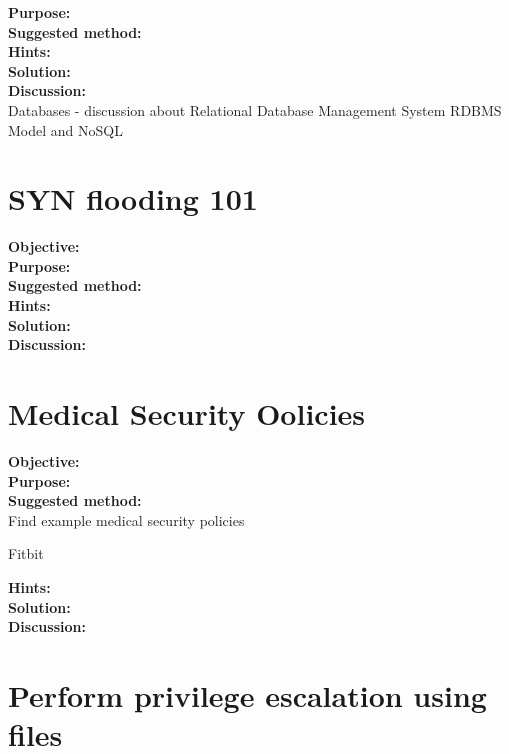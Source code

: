 \documentclass[a4paper,11pt,notitlepage]{report}
\begin{document}
{\bf Purpose:}\\


{\bf Suggested method:}\\


{\bf Hints:}\\


{\bf Solution:}\\


{\bf Discussion:}\\
Databases - discussion about Relational Database Management System RDBMS Model and NoSQL



\chapter{SYN flooding 101}
\label{ex:syn-flood-101}

{\bf Objective:}\\


{\bf Purpose:}\\


{\bf Suggested method:}\\


{\bf Hints:}\\


{\bf Solution:}\\


{\bf Discussion:}\\



\chapter{Medical Security Oolicies}
\label{ex:medical-security-policy}

{\bf Objective:}\\


{\bf Purpose:}\\


{\bf Suggested method:}\\
Find example medical security policies

Fitbit


{\bf Hints:}\\


{\bf Solution:}\\


{\bf Discussion:}\\



\chapter{Perform privilege escalation using files}
\label{ex:priv-esc-cron}
\end{document}
